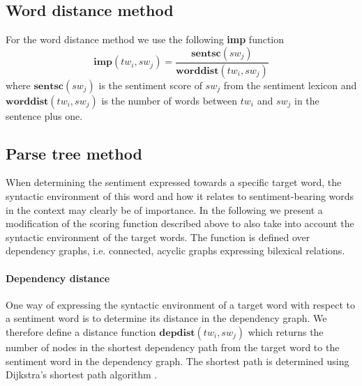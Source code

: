 \documentclass[11pt]{article}
\begin{document}
\subsection{Word distance method}
\label{sec:wd}

For the word distance method we use the following \textbf{imp} function
\begin{equation}
  \label{eq:2}
  \mathbf{imp}(tw_i, sw_{j}) = \frac{\mathbf{sentsc}(sw_{j})}{\mathbf{worddist}(tw_i, sw_{j})}
\end{equation}
where $\mathbf{sentsc}(sw_{j})$ is the sentiment score of $sw_{j}$ from the sentiment lexicon and $\mathbf{worddist}(tw_i, sw_{j})$ is the number of words between $tw_i$ and $sw_{j}$ in the sentence plus one.

\subsection{Parse tree method}
\label{sec:dp}
When determining the sentiment expressed towards a specific target
word, the syntactic environment of this word and how it relates to
sentiment-bearing words in the context may clearly be of importance.
In the following we present a modification of the scoring function described above to also take into account the syntactic environment of the target words. The function is defined over dependency graphs, i.e. connected, acyclic graphs expressing bilexical relations.

\paragraph{Dependency distance} One way of expressing the syntactic environment of a target word with respect to a sentiment word is to determine its distance in the dependency graph. We therefore define a distance function $\mathbf{depdist}(tw_i, sw_{j})$ which returns the number of nodes in the shortest dependency path from the target word to the sentiment word in the dependency graph. The shortest path is determined using Dijkstra's shortest path algorithm \cite{Dij:59}.
\end{document}
